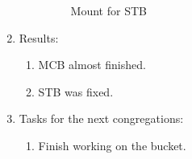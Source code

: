 \begin{enumerate}
\begin{enumerate}
\begin{figure}[H]
\begin{minipage}[h]{0.47\linewidth}
				\caption{Mount for STB}
			\end{minipage}
		\end{figure}
		
	\end{enumerate}
	
	\item Results:
	\begin{enumerate}
		\item MCB almost finished.
		
		\item STB was fixed.
		
	\end{enumerate}
	
	\item Tasks for the next congregations:
	\begin{enumerate}
		\item Finish working on the bucket.
		
	\end{enumerate}     
\end{enumerate}
\fillpage

